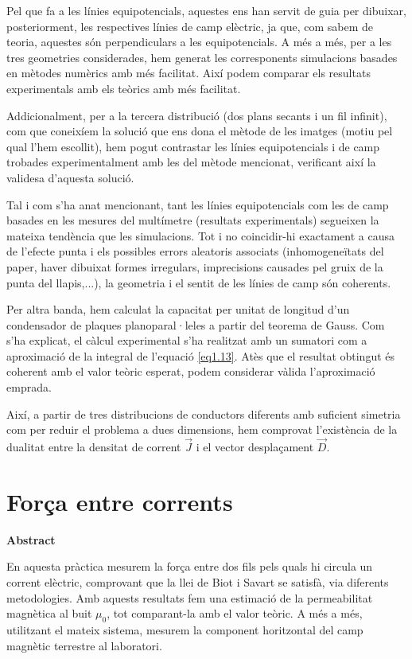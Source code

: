 \documentclass[a4paper,10.5pt]{report}
\newenvironment{chapterabstract}{
	\begin{center}
		\bfseries Abstract
	\end{center}
	\quotation
}{\endquotation}
\begin{document}
Pel que fa a les línies equipotencials, aquestes ens han servit de guia per dibuixar, posteriorment, les respectives línies de camp elèctric, ja que, com sabem de teoria, aquestes són perpendiculars a les equipotencials. A més a més, per a les tres geometries considerades, hem generat les corresponents simulacions basades en mètodes numèrics amb més facilitat. Així podem comparar els resultats experimentals amb els teòrics amb més facilitat.

Addicionalment, per a la tercera distribució (dos plans secants i un fil infinit), com que coneixíem la solució que ens dona el mètode de les imatges (motiu pel qual l'hem escollit), hem pogut contrastar les línies equipotencials i de camp trobades experimentalment amb les del mètode mencionat, verificant així la validesa d'aquesta solució.

Tal i com s'ha anat mencionant, tant les línies equipotencials com les de camp basades en les mesures del multímetre (resultats experimentals) segueixen la mateixa tendència que les simulacions. Tot i no coincidir-hi exactament a causa de l'efecte punta i els possibles errors aleatoris associats (inhomogeneïtats del paper, haver dibuixat formes irregulars, imprecisions causades pel gruix de la punta del llapis,...), la geometria i el sentit de les línies de camp són coherents.

Per altra banda, hem calculat la capacitat per unitat de longitud d'un condensador de plaques planoparal·leles a partir del teorema de Gauss. Com s'ha explicat, el càlcul experimental s'ha realitzat amb un sumatori com a aproximació de la integral de l'equació \ref{eq1.13}. Atès que el resultat obtingut és coherent amb el valor teòric esperat, podem considerar vàlida l'aproximació emprada.

Així, a partir de tres distribucions de conductors diferents amb suficient simetria com per reduir el problema a dues dimensions, hem comprovat l'existència de la dualitat entre la densitat de corrent $\vec{J}$ i el vector desplaçament $\vec{D}$.

\chapter{Força entre corrents}
\begin{chapterabstract}
	En aquesta pràctica mesurem la força entre dos fils pels quals hi circula un corrent elèctric, comprovant que la llei de Biot i Savart se satisfà, via diferents metodologies. Amb aquests resultats fem una estimació de la permeabilitat magnètica al buit $\mu_0$, tot comparant-la amb el valor teòric. A més a més, utilitzant el mateix sistema, mesurem la component horitzontal del camp magnètic terrestre al laboratori.
\end{chapterabstract}
\end{document}

